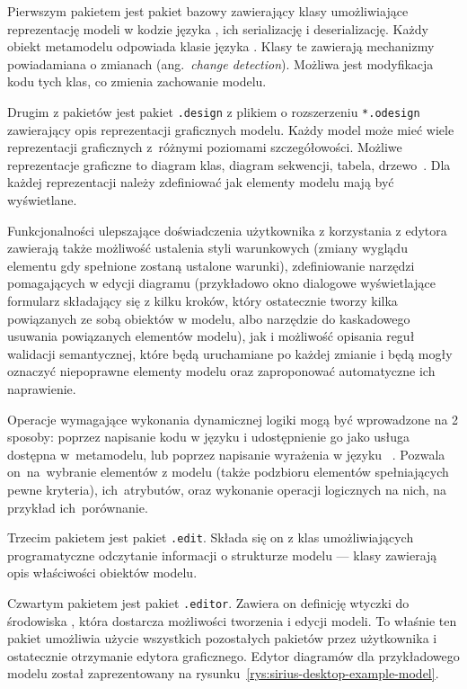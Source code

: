 Pierwszym pakietem jest pakiet bazowy zawierający klasy umożliwiające
reprezentację modeli w
kodzie języka \Java{}, ich serializację i deserializację. Każdy obiekt
metamodelu
odpowiada klasie języka \Java{}. Klasy te zawierają mechanizmy powiadamiana o
zmianach (ang.~\emph{change detection}).
Możliwa jest modyfikacja kodu tych klas, co zmienia zachowanie
modelu.

Drugim z pakietów jest pakiet \texttt{.design} z plikiem o rozszerzeniu
\texttt{*.odesign} zawierający opis reprezentacji graficznych modelu. Każdy
model może mieć wiele reprezentacji graficznych z~różnymi poziomami
szczegółowości.
Możliwe reprezentacje graficzne to diagram klas, diagram
sekwencji, tabela, drzewo~\cite{dokumentacja-sirius-desktop}. Dla każdej
reprezentacji należy zdefiniować jak elementy modelu mają być wyświetlane.

Funkcjonalności ulepszające doświadczenia użytkownika z
korzystania z edytora zawierają także możliwość ustalenia styli warunkowych
(zmiany wyglądu elementu gdy spełnione zostaną ustalone warunki), zdefiniowanie
narzędzi pomagających w edycji diagramu (przykładowo okno dialogowe
wyświetlające formularz składający się z kilku kroków, który ostatecznie tworzy
kilka powiązanych ze sobą obiektów w modelu, albo narzędzie do kaskadowego
usuwania powiązanych elementów modelu), jak i możliwość opisania reguł
walidacji semantycznej, które będą uruchamiane po każdej zmianie i będą mogły
oznaczyć niepoprawne elementy modelu oraz zaproponować automatyczne ich
naprawienie.

Operacje wymagające wykonania dynamicznej logiki mogą być wprowadzone na 2
sposoby: poprzez napisanie kodu w języku \Java{} i udostępnienie go jako usługa
dostępna w~metamodelu, lub poprzez napisanie wyrażenia w języku
~\cite{dokumentacja-aql}.
Pozwala on~na~wybranie elementów z modelu (także podzbioru elementów
spełniających pewne kryteria), ich~atrybutów, oraz wykonanie operacji
logicznych na nich, na przykład ich~porównanie.

Trzecim pakietem jest pakiet \texttt{.edit}. Składa się on z klas
umożliwiających programatyczne odczytanie informacji o strukturze modelu ---
klasy zawierają opis właściwości obiektów modelu.

Czwartym pakietem jest pakiet \texttt{.editor}. Zawiera on definicję wtyczki do
środowiska \Eclipse{}, która dostarcza możliwości tworzenia i edycji
modeli. To właśnie ten pakiet umożliwia użycie wszystkich pozostałych pakietów
przez użytkownika i ostatecznie otrzymanie edytora graficznego. Edytor
diagramów dla przykładowego modelu został zaprezentowany na
rysunku~\ref{rys:sirius-desktop-example-model}.

